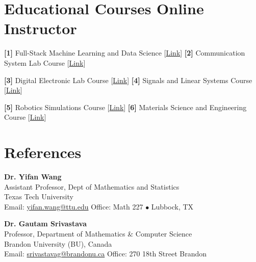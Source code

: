 \documentclass[10pt,letterpaper]{article}
\newcommand{\lk}[2]{[\href{#1}{#2}]}
\begin{document}
\section{Educational Courses Online Instructor}
\textbf{[1]} Full-Stack Machine Learning and Data Science \lk{https://www.youtube.com/watch?v=2Y372E-Pje4&list=PLw3QFYXl64bg6yi3ISs-PRG_YgBK4IUVQ}{Link} \hfill \textbf{[2]} Communication System Lab Course \lk{https://www.youtube.com/watch?v=kX384Gzqbf8&list=PLw3QFYXl64bjbtfuO1Be06Yb9HQMJTdcP}{Link}\par
\textbf{[3]} Digital Electronic Lab Course \lk{https://www.youtube.com/watch?v=RbC8MWOONn8&list=PLw3QFYXl64bjjXqREa9sjWjtsUJ2ZsAmB}{Link} \hfill \textbf{[4]} Signals and Linear Systems Course \lk{https://www.youtube.com/watch?v=4G5aj3SbGLw&list=PLw3QFYXl64bhuh7u5MjUD_CMS6tlIXV5U}{Link}\par
\textbf{[5]} Robotics Simulations Course \lk{https://www.youtube.com/watch?v=2tXBcxY3k1M&list=PLw3QFYXl64bir5ASIh3-H9CeBFMOx3hXo}{Link} \hfill \textbf{[6]} Materials Science and Engineering Course \lk{https://www.youtube.com/watch?v=Gm8KsHsEf04&list=PLw3QFYXl64bhqowZPyR8mr-qVoT-8NDog}{Link}\par

\section{References}
\noindent
\begin{minipage}[t]{0.48\linewidth}
\textbf{Dr. Yifan Wang}\\[2pt]
Assistant Professor, Dept of Mathematics and Statistics\\
Texas Tech University\\
Email: \href{mailto:yifan.wang@ttu.edu}{yifan.wang@ttu.edu} Office: Math 227 $\bullet$ Lubbock, TX
\end{minipage}\hfill
\begin{minipage}[t]{0.48\linewidth}
\textbf{Dr. Gautam Srivastava}\\[2pt]
Professor, Department of Mathematics \& Computer Science\\
Brandon University (BU), Canada\\
Email: \href{mailto:srivastavag@brandonu.ca}{srivastavag@brandonu.ca} Office: 270 18th Street \mbox{Brandon}
\end{minipage}
\end{document}
